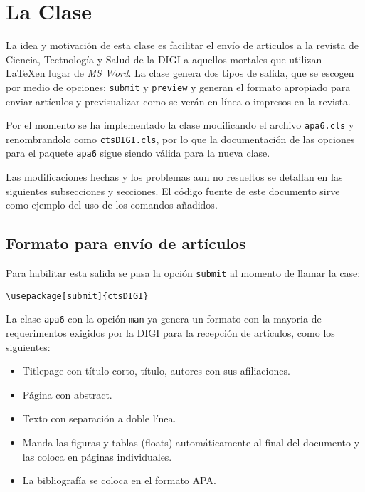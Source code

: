 \documentclass[submit,biblatex]{ctsDIGI}
\author{L.García, H. Pérez*}
\affiliation{Escuela de ciencias Físicas y Matemáticas, Universidad de San Carlos de Guatemala, Guatemala}
\begin{document}
\maketitle





\section{La Clase}
La idea y motivación de esta clase es facilitar el envío de articulos a la revista de Ciencia, Tectnología y Salud de la DIGI a aquellos mortales que utilizan \LaTeX en lugar de \emph{MS Word}. La clase genera dos tipos de salida, que se escogen por medio de opciones: \texttt{submit} y \texttt{preview} y generan el formato apropiado para enviar artículos y previsualizar como se verán en línea o impresos en la revista.

Por el momento se ha implementado la clase modificando el archivo \texttt{apa6.cls} y renombrandolo como \texttt{ctsDIGI.cls}, por lo que la documentación de las opciones para el paquete \texttt{apa6} sigue siendo válida para la nueva clase.

Las modificaciones hechas y los problemas aun no resueltos se detallan en las siguientes subsecciones y secciones. El código fuente de este documento sirve como ejemplo del uso de los comandos añadidos.

\subsection{Formato para envío de artículos}
Para habilitar esta salida se pasa la opción \texttt{submit} al momento de llamar la case:
\begin{verbatim}
\usepackage[submit]{ctsDIGI}
\end{verbatim}

La clase \texttt{apa6} con la opción \texttt{man} ya genera un formato con la mayoria de requerimentos exigidos por la DIGI para la recepción de artículos, como los siguientes:
\begin{itemize}
\item Titlepage con título corto, título, autores con sus afiliaciones.
\item Página con abstract.
\item Texto con separación a doble línea.
\item Manda las figuras y tablas (floats) automáticamente al final del documento y las coloca en páginas individuales.
\item La bibliografía se coloca en el formato APA.
\end{itemize}
\end{document}
